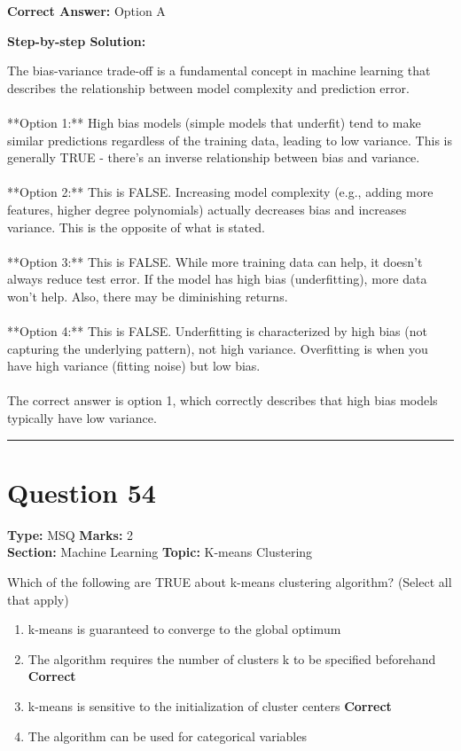 \documentclass[11pt]{article}
\begin{document}
\textbf{Correct Answer:} Option A

\textbf{Step-by-step Solution:}

The bias-variance trade-off is a fundamental concept in machine learning that describes the relationship between model complexity and prediction error.\\
\\
**Option 1:** High bias models (simple models that underfit) tend to make similar predictions regardless of the training data, leading to low variance. This is generally TRUE - there's an inverse relationship between bias and variance.\\
\\
**Option 2:** This is FALSE. Increasing model complexity (e.g., adding more features, higher degree polynomials) actually decreases bias and increases variance. This is the opposite of what is stated.\\
\\
**Option 3:** This is FALSE. While more training data can help, it doesn't always reduce test error. If the model has high bias (underfitting), more data won't help. Also, there may be diminishing returns.\\
\\
**Option 4:** This is FALSE. Underfitting is characterized by high bias (not capturing the underlying pattern), not high variance. Overfitting is when you have high variance (fitting noise) but low bias.\\
\\
The correct answer is option 1, which correctly describes that high bias models typically have low variance.

\vspace{0.8em}
\hrule
\vspace{0.4em}
\section*{Question 54}
\textbf{Type:} MSQ \hfill \textbf{Marks:} 2\\
\textbf{Section:} Machine Learning \hfill \textbf{Topic:} K-means Clustering

Which of the following are TRUE about k-means clustering algorithm? (Select all that apply)


\begin{enumerate}[label=\textbf{\Alph*.}, leftmargin=1.8em]
\item k-means is guaranteed to converge to the global optimum\item The algorithm requires the number of clusters k to be specified beforehand \hfill {\color{gategreen}\textbf{Correct}}\item k-means is sensitive to the initialization of cluster centers \hfill {\color{gategreen}\textbf{Correct}}\item The algorithm can be used for categorical variables\end{enumerate}
\end{document}
